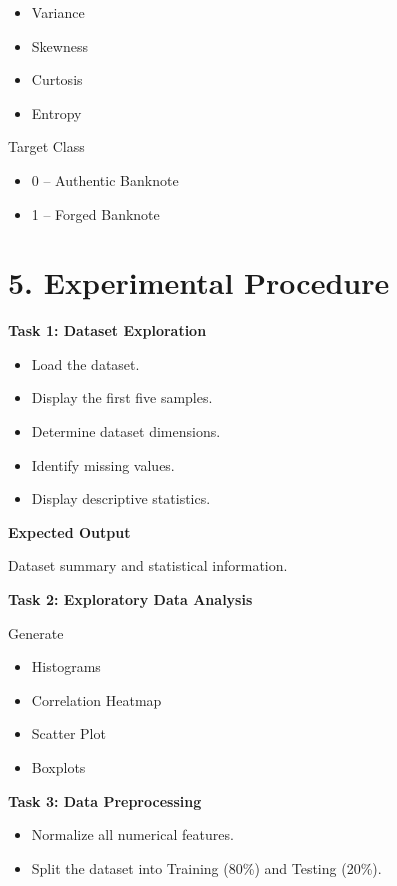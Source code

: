\documentclass[11pt]{article}
\begin{document}
\begin{itemize}
\item Variance
\item Skewness
\item Curtosis
\item Entropy
\end{itemize}

Target Class

\begin{itemize}
\item 0 -- Authentic Banknote
\item 1 -- Forged Banknote
\end{itemize}


\section*{5. Experimental Procedure}

\textbf{Task 1: Dataset Exploration}

\begin{itemize}
\item Load the dataset.
\item Display the first five samples.
\item Determine dataset dimensions.
\item Identify missing values.
\item Display descriptive statistics.
\end{itemize}

\textbf{Expected Output}

Dataset summary and statistical information.

\vspace{2mm}

\textbf{Task 2: Exploratory Data Analysis}

Generate

\begin{itemize}
\item Histograms
\item Correlation Heatmap
\item Scatter Plot
\item Boxplots
\end{itemize}

\vspace{2mm}

\textbf{Task 3: Data Preprocessing}

\begin{itemize}
\item Normalize all numerical features.
\item Split the dataset into Training (80\%) and Testing (20\%).
\end{itemize}
\end{document}
